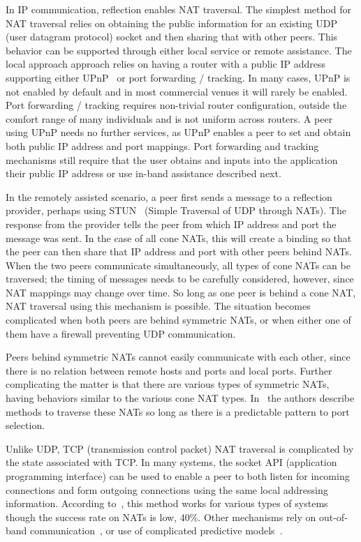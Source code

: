 In IP communication, reflection enables NAT traversal.  The simplest method for
NAT traversal relies on obtaining the public information for an existing UDP
(user datagram protocol) socket and then sharing that with other peers.  This
behavior can be supported through either local service or remote assistance.
The local approach approach relies on having a router with a public IP address
supporting either UPnP~\cite{upnp} or port forwarding / tracking.  In many
cases, UPnP is not enabled by default and in most commercial venues it will
rarely be enabled.  Port forwarding / tracking requires non-trivial router
configuration, outside the comfort range of many individuals and is not uniform
across routers.  A peer using UPnP needs no further services, as UPnP enables a
peer to set and obtain both public IP address and port mappings.  Port
forwarding and tracking mechanisms still require that the user obtains and
inputs into the application their public IP address or use in-band assistance
described next.

In the remotely assisted scenario, a peer first sends a message to a reflection
provider, perhaps using STUN~\cite{stun_rfc} (Simple Traversal of UDP through
NATs).  The response from the provider tells the peer from which IP address and
port the message was sent.  In the case of all cone NATs, this will create a
binding so that the peer can then share that IP address and port with other
peers behind NATs.  When the two peers communicate simultaneously, all types of
cone NATs can be traversed; the timing of messages needs to be carefully
considered, however, since NAT mappings may change over time.  So long as one
peer is behind a cone NAT, NAT traversal using this mechanism is possible.  The
situation becomes complicated when both peers are behind symmetric NATs, or
when either one of them have a firewall preventing UDP communication.

Peers behind symmetric NATs cannot easily communicate with each other, since
there is no relation between remote hosts and ports and local ports.  Further
complicating the matter is that there are various types of symmetric NATs,
having behaviors similar to the various cone NAT types. In~\cite{ice} the
authors describe methods to traverse these NATs so long as there is a
predictable pattern to port selection.  

Unlike UDP, TCP (transmission control packet) NAT traversal is complicated by
the state associated with TCP.  In many systems, the socket API (application
programming interface) can be used to enable a peer to both listen for incoming
connections and form outgoing connections using the same local addressing
information.  According to~\cite{ice-tcp}, this method works for various types
of systems though the success rate on NATs is low, 40\%.  Other mechanisms rely
on out-of-band communication~\cite{pvc}, or use of complicated predictive
models~\cite{tcp-hole-punching}.

